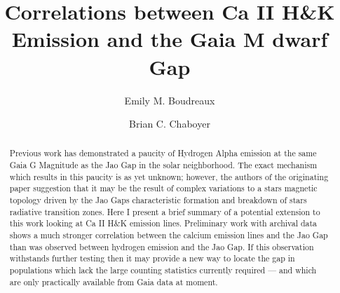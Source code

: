 \documentclass[twocolumn]{aastex62}
\begin{document}
\title{Correlations between Ca II H\&K Emission and the Gaia M dwarf Gap}


\author[0000-0002-2600-7513]{Emily M. Boudreaux}

\author[0000-0003-3096-4161]{Brian C. Chaboyer}

\received{}
\revised{}
\revised{}
\accepted{}


\begin{abstract}
Previous work has demonstrated a paucity of Hydrogen Alpha emission at the same
  Gaia G Magnitude as the Jao Gap in the solar neighborhood. The exact
  mechanism which results in this paucity is as yet unknown; however, the
  authors of the originating paper suggestion that it may be the result of
  complex variations to a stars magnetic topology driven by the Jao Gaps
  characteristic formation and breakdown of stars radiative transition zones.
  Here I present a brief summary of a potential extension to this work looking
  at Ca II H\&K emission lines. Preliminary work with archival data shows a
  much stronger correlation between the calcium emission lines and the Jao Gap
  than was observed between hydrogen emission and the Jao Gap. If this
  observation withstands further testing then it may provide a new way to
  locate the gap in populations which lack the large counting statistics
  currently required --- and which are only practically available from Gaia
  data at moment.

\end{abstract}












\acknowledgments
\end{document}
